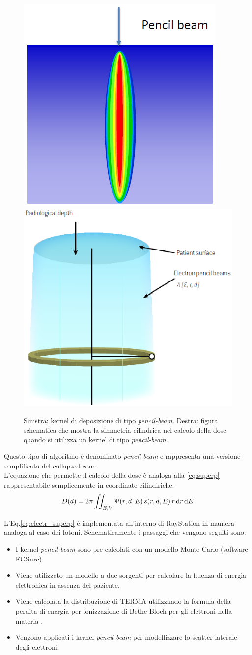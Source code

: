 {\begin{figure}
\centering
\includegraphics[width=.4\textwidth]{./cap1/electr_pencil.png}$\qquad$
\includegraphics[width=.45\textwidth]{./cap1/electr_pencil_b.png}
\caption{Sinistra: kernel di deposizione di tipo \textit{pencil-beam}. Destra: figura schematica che mostra la simmetria cilindrica nel calcolo della dose quando si utilizza un kernel di tipo \textit{pencil-beam}.}
\label{fig:electr_pencil}
\end{figure}


Questo tipo di algoritmo è denominato \textit{pencil-beam} e rappresenta una versione semplificata del collapsed-cone.\\
L'equazione che permette il calcolo della dose è analoga alla \eqref{eq:superp} rappresentabile semplicemente in coordinate cilindiriche:
\begin{equation}
\label{eq:electr_superp}
D(d) = 2\pi \iint_{E,V} \Psi(r,d,E)\, s(r,d,E)\, r\,\text{d} r \,\text{d} E
\end{equation}

L'Eq.\eqref{eq:electr_superp} è implementata all'interno di RayStation in maniera analoga al caso dei fotoni. Schematicamente i passaggi che vengono seguiti sono:
\begin{itemize}
\item I kernel \textit{pencil-beam} sono pre-calcolati con un modello Monte Carlo (software EGSnrc).
\item Viene utilizzato un modello a due sorgenti per calcolare la fluenza di energia elettronica in assenza del paziente.
\item Viene calcolata la distribuzione di TERMA utilizzando la formula della perdita di energia per ionizzazione di Bethe-Bloch per gli elettroni nella materia \cite{RaySearchLaboratories2014}.
\item Vengono applicati i kernel \textit{pencil-beam} per modellizzare lo scatter laterale degli elettroni.
\end{itemize}

}
